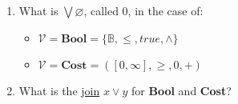 \begin{enumerate}
    \item   What is $\bigvee \varnothing$, called $0$, in the case of:
          \begin{itemize}
            \item $\mathcal{V}=\mathbf{Bool}=\{\mathbb{B},\leq, true,\land\}$
            \item $\mathcal{V}=\mathbf{Cost}=([0,\infty],\geq,0,+)$
          \end{itemize}
    \item What is the \hyperref[D1.81]{join} $x \vee y$ for \textbf{Bool} and \textbf{Cost}?
  \end{enumerate}